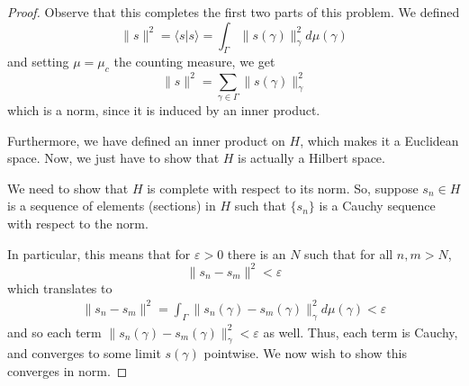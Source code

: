 \documentclass[fontsize=11pt]{scrartcl} %
\numberwithin{equation}{section} %
\numberwithin{figure}{section} %
\numberwithin{table}{section} %
\newcommand{\la}{\langle}
\newcommand{\ra}{\rangle}
\begin{document}
\begin{proof}
    Observe that this completes the first two parts of this problem. We defined
    \[
        \|s\|^2 = \la s|s\ra = \int_{\Gamma}\|s(\gamma)\|_{\gamma}^2
        d\mu(\gamma)
    \]
    and setting $\mu = \mu_c$ the counting measure, we get
    \[
        \|s\|^2 = \sum_{\gamma\in\Gamma}\|s(\gamma)\|_{\gamma}^2
    \]
    which is a norm, since it is induced by an inner product.

    Furthermore, we have defined an inner product on $H$, which makes it a
    Euclidean space. Now, we just have to show that $H$ is actually a Hilbert
    space.


    We need to show that $H$ is complete with respect to its norm. So, suppose
    $s_n\in H$ is a sequence of elements (sections) in $H$ such that $\{s_n\}$
    is a Cauchy sequence with respect to the norm.

    In particular, this means that for $\varepsilon>0$ there is an $N$ such that
    for all $n,m>N$,
    \[
        \|s_n-s_m\|^2 < \varepsilon
    \]
    which translates to
    \[
        \begin{aligned}
            \|s_n-s_m\|^2 = \int_{\Gamma}\|s_n(\gamma) - s_m(\gamma)\|_{\gamma}^2
            d\mu(\gamma) <
            \varepsilon
    \end{aligned}
    \]
    and so each term $\|s_n(\gamma)-s_m(\gamma)\|_{\gamma}^2 < \varepsilon$ as
    well. Thus, each term is Cauchy, and converges to some limit $s(\gamma)$
    pointwise. We now wish to show this converges in norm. 

\end{proof}
\end{document}
